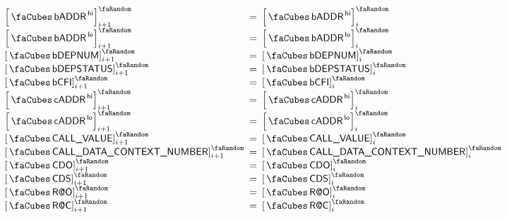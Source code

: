 \begin{description}
\[\begin{array}{lcl}
				\order{\cnCodeAddress\high     }     _{i + 1} & \!\!\! = \!\!\! & \order{\cnCodeAddress\high     }      _{i} \\
				\order{\cnCodeAddress\low      }     _{i + 1} & \!\!\! = \!\!\! & \order{\cnCodeAddress\low      }      _{i} \\
				\order{\cnCodeDepNum           }     _{i + 1} & \!\!\! = \!\!\! & \order{\cnCodeDepNum           }      _{i} \\
				\order{\cnCodeDepStatus        }     _{i + 1} & \!\!\! = \!\!\! & \order{\cnCodeDepStatus        }      _{i} \\
				\order{\cnCodeCfi              }     _{i + 1} & \!\!\! = \!\!\! & \order{\cnCodeCfi              }      _{i} \\
				\order{\cnCallerAddress\high   }     _{i + 1} & \!\!\! = \!\!\! & \order{\cnCallerAddress\high   }      _{i} \\
				\order{\cnCallerAddress\low    }     _{i + 1} & \!\!\! = \!\!\! & \order{\cnCallerAddress\low    }      _{i} \\
				\order{\cnCallValue            }     _{i + 1} & \!\!\! = \!\!\! & \order{\cnCallValue            }      _{i} \\
				\order{\cnCallDataContextNumber}     _{i + 1} & \!\!\! = \!\!\! & \order{\cnCallDataContextNumber}      _{i} \\
				\order{\cnCdo                  }     _{i + 1} & \!\!\! = \!\!\! & \order{\cnCdo                  }      _{i} \\
				\order{\cnCds                  }     _{i + 1} & \!\!\! = \!\!\! & \order{\cnCds                  }      _{i} \\
				\order{\cnRao                  }     _{i + 1} & \!\!\! = \!\!\! & \order{\cnRao                  }      _{i} \\
				\order{\cnRac                  }     _{i + 1} & \!\!\! = \!\!\! & \order{\cnRac                  }      _{i} \\

\end{array}\]
\end{description}
